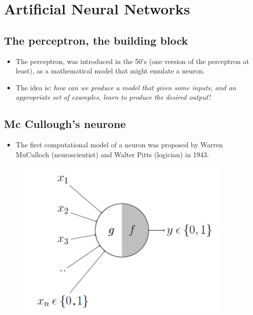 \documentclass[
  letterpaper,
  DIV=11,
  numbers=noendperiod]{scrartcl}
\providecommand{\tightlist}{%
  \setlength{\itemsep}{0pt}\setlength{\parskip}{0pt}}\usepackage{longtable,booktabs,array}
\begin{document}
\hypertarget{artificial-neural-networks}{%
\section{Artificial Neural Networks}\label{artificial-neural-networks}}

\hypertarget{the-perceptron-the-building-block}{%
\subsection{The perceptron, the building
block}\label{the-perceptron-the-building-block}}

\begin{itemize}
\item
  The perceptron, was introduced in the 50's (one version of the
  perceptron at least), as a mathematical model that might emulate a
  neuron.
\item
  The idea is: \emph{how can we produce a model that given some inputs,
  and an appropriate set of examples, learn to produce the desired
  output}?
\end{itemize}

\hypertarget{mc-culloughs-neurone}{%
\subsection{Mc Cullough's neurone}\label{mc-culloughs-neurone}}

\begin{itemize}
\tightlist
\item
  The first computational model of a neuron was proposed by Warren
  MuCulloch (neuroscientist) and Walter Pitts (logician) in 1943.
\end{itemize}

\begin{figure}

{\centering 

\href{https://towardsdatascience.com/mcculloch-pitts-model-5fdf65ac5dd1}{\includegraphics[width=0.93\textwidth,height=\textheight]{images/MacCulloghPitts-Neuron.png}}

}

\end{figure}
\end{document}
